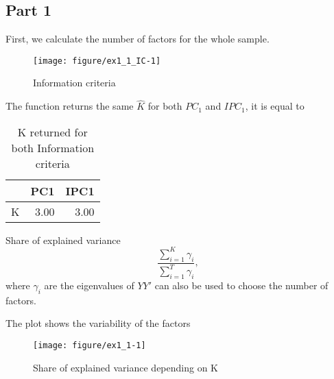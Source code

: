 \documentclass[12pt, a4paper]{article}\usepackage[]{graphicx}\usepackage[]{color}
\makeatletter
\def\maxwidth{ %
  \ifdim\Gin@nat@width>\linewidth
    \linewidth
  \else
    \Gin@nat@width
  \fi
}
\newenvironment{knitrout}{}{} %
\makeatother
\begin{document}
\subsection{Part 1}
First, we calculate the number of factors for the whole sample. 
\begin{knitrout}
\color{fgcolor}\begin{figure}[H]

{\centering \texttt{[image: figure/ex1\_1\_IC-1]} 

}

\caption[Information criteria]{Information criteria}\label{fig:ex1.1.IC}
\end{figure}


\end{knitrout}
The function returns the same $\hat{K}$ for both $PC_1$ and $IPC_1$, it is equal to 
\begin{table}[H]
\centering
\begin{tabular}{rrr}
  \hline
  & PC1 & IPC1 \\ 
  \hline
K & 3.00 & 3.00 \\ 
   \hline
\end{tabular}
\caption{K returned for both Information criteria} 
\label{tab:K}
\end{table}




Share of explained variance
\begin{equation}
\label{share}
\frac{\sum_{i=1}^{K} \gamma_i }{\sum_{i=1}^{T} \gamma_i},
\end{equation}
where $\gamma_i$ are the eigenvalues of $Y Y'$ can also be used to choose the number of factors.


The plot shows the variability of the factors
\begin{knitrout}
\color{fgcolor}\begin{figure}[H]

{\centering \texttt{[image: figure/ex1\_1-1]} 

}

\caption[Share of explained variance depending on K]{Share of explained variance depending on K}\label{fig:ex1.1}
\end{figure}


\end{knitrout}
\end{document}
